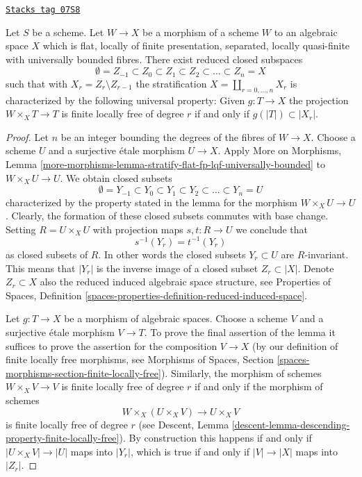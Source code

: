 \begin{lemma}
\label{decent-spaces-lemma-quasi-compact-reasonable-stratification}
\href{https://stacks.math.columbia.edu/tag/07S8}{\texttt{Stacks tag 07S8}}

Let $S$ be a scheme. Let $W \to X$ be a morphism of a scheme $W$
to an algebraic space $X$ which is flat, locally of finite presentation,
separated, locally quasi-finite with universally bounded fibres. There exist
reduced closed subspaces
$$
\emptyset = Z_{-1} \subset Z_0 \subset Z_1 \subset Z_2 \subset
\ldots \subset Z_n = X
$$
such that with $X_r = Z_r \setminus Z_{r - 1}$ the stratification
$X = \coprod_{r = 0, \ldots, n} X_r$ is characterized by the following
universal property: Given $g : T \to X$ the projection
$W \times_X T \to T$ is finite locally free of degree $r$ if and only if
$g(|T|) \subset |X_r|$.
\end{lemma}

\begin{proof}
Let $n$ be an integer bounding the degrees of the fibres of $W \to X$.
Choose a scheme $U$ and a surjective \'etale morphism $U \to X$.
Apply More on Morphisms, Lemma
\ref{more-morphisms-lemma-stratify-flat-fp-lqf-universally-bounded}
to $W \times_X U \to U$. We obtain closed subsets
$$
\emptyset = Y_{-1} \subset Y_0 \subset Y_1 \subset Y_2 \subset
\ldots \subset Y_n = U
$$
characterized by the property stated in the lemma for the morphism
$W \times_X U \to U$. Clearly, the formation of these closed subsets commutes
with base change. Setting $R = U \times_X U$ with projection maps
$s, t : R \to U$ we conclude that
$$
s^{-1}(Y_r) = t^{-1}(Y_r)
$$
as closed subsets of $R$. In other words the closed subsets $Y_r \subset U$
are $R$-invariant. This means that $|Y_r|$ is the inverse image of a closed
subset $Z_r \subset |X|$. Denote $Z_r \subset X$ also the reduced induced
algebraic space structure, see
Properties of Spaces, Definition
\ref{spaces-properties-definition-reduced-induced-space}.

\medskip\noindent
Let $g : T \to X$ be a morphism of algebraic spaces. Choose a scheme $V$
and a surjective \'etale morphism $V \to T$. To prove the final
assertion of the lemma it suffices to prove the assertion for the composition
$V \to X$ (by our definition of finite locally free morphisms, see
Morphisms of Spaces, Section
\ref{spaces-morphisms-section-finite-locally-free}).
Similarly, the morphism of schemes $W \times_X V \to V$ is finite
locally free of degree $r$ if and only if the morphism of schemes
$$
W \times_X (U \times_X V)
\longrightarrow
U \times_X V
$$
is finite locally free of degree $r$ (see
Descent, Lemma \ref{descent-lemma-descending-property-finite-locally-free}).
By construction this happens if and only if $|U \times_X V| \to |U|$
maps into $|Y_r|$, which is true if and only if $|V| \to |X|$ maps
into $|Z_r|$.
\end{proof}

